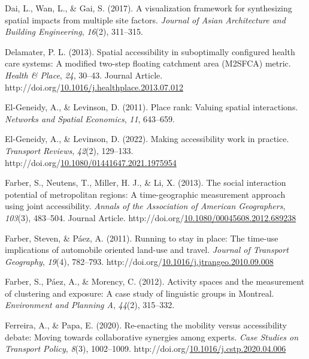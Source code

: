 \documentclass[
11pt, %
oneside, %
english, %
singlespacing, %
]{macthesis} %
\newlength{\cslhangindent}
\newenvironment{CSLReferences}[2] %
{\begin{list}{}{%
	\setlength{\itemindent}{0pt}
	\setlength{\leftmargin}{0pt}
	\setlength{\parsep}{0pt}
	\ifodd #1
	\setlength{\leftmargin}{\cslhangindent}
	\setlength{\itemindent}{-1\cslhangindent}
	\fi
	\setlength{\itemsep}{#2\baselineskip}}}
{\end{list}}
\begin{document}
\begin{CSLReferences}{1}{0}
Dai, L., Wan, L., \& Gai, S. (2017). A visualization framework for synthesizing spatial impacts from multiple site factors. \emph{Journal of Asian Architecture and Building Engineering}, \emph{16}(2), 311--315.

Delamater, P. L. (2013). Spatial accessibility in suboptimally configured health care systems: A modified two-step floating catchment area (M2SFCA) metric. \emph{Health \& Place}, \emph{24}, 30--43. Journal Article. http://doi.org/\href{https://doi.org/10.1016/j.healthplace.2013.07.012}{10.1016/j.healthplace.2013.07.012}

El-Geneidy, A., \& Levinson, D. (2011). Place rank: Valuing spatial interactions. \emph{Networks and Spatial Economics}, \emph{11}, 643--659.

El-Geneidy, A., \& Levinson, D. (2022). Making accessibility work in practice. \emph{Transport Reviews}, \emph{42}(2), 129--133. http://doi.org/\href{https://doi.org/10.1080/01441647.2021.1975954}{10.1080/01441647.2021.1975954}

Farber, S., Neutens, T., Miller, H. J., \& Li, X. (2013). The social interaction potential of metropolitan regions: A time-geographic measurement approach using joint accessibility. \emph{Annals of the Association of American Geographers}, \emph{103}(3), 483--504. Journal Article. http://doi.org/\href{https://doi.org/10.1080/00045608.2012.689238}{10.1080/00045608.2012.689238}

Farber, Steven, \& Páez, A. (2011). Running to stay in place: The time-use implications of automobile oriented land-use and travel. \emph{Journal of Transport Geography}, \emph{19}(4), 782--793. http://doi.org/\href{https://doi.org/10.1016/j.jtrangeo.2010.09.008}{10.1016/j.jtrangeo.2010.09.008}

Farber, S., Páez, A., \& Morency, C. (2012). Activity spaces and the measurement of clustering and exposure: A case study of linguistic groups in {Montreal}. \emph{Environment and Planning A}, \emph{44}(2), 315--332.

Ferreira, A., \& Papa, E. (2020). Re-enacting the mobility versus accessibility debate: Moving towards collaborative synergies among experts. \emph{Case Studies on Transport Policy}, \emph{8}(3), 1002--1009. http://doi.org/\href{https://doi.org/10.1016/j.cstp.2020.04.006}{10.1016/j.cstp.2020.04.006}


\end{CSLReferences}
\end{document}
